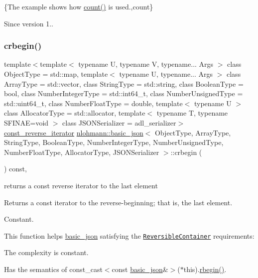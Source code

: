 \{The example shows how {\ttfamily \mbox{\hyperlink{classnlohmann_1_1basic__json_a0d74bfcf65662f1d66d14c34b0027098}{count()}}} is used.,count\}

\begin{DoxySince}{Since}
version 1.. 
\end{DoxySince}
\mbox{\label{classnlohmann_1_1basic__json_a1e0769d22d54573f294da0e5c6abc9de}} 
\subsubsection{\texorpdfstring{crbegin()}{crbegin()}}
{\footnotesize\ttfamily template$<$template$<$ typename U, typename V, typename... Args $>$ class Object\+Type = std\+::map, template$<$ typename U, typename... Args $>$ class Array\+Type = std\+::vector, class String\+Type  = std\+::string, class Boolean\+Type  = bool, class Number\+Integer\+Type  = std\+::int64\+\_\+t, class Number\+Unsigned\+Type  = std\+::uint64\+\_\+t, class Number\+Float\+Type  = double, template$<$ typename U $>$ class Allocator\+Type = std\+::allocator, template$<$ typename T, typename S\+F\+I\+N\+A\+E=void $>$ class J\+S\+O\+N\+Serializer = adl\+\_\+serializer$>$ \\
\mbox{\hyperlink{classnlohmann_1_1basic__json_a72be3c24bfa24f0993d6c11af03e7404}{const\+\_\+reverse\+\_\+iterator}} \mbox{\hyperlink{classnlohmann_1_1basic__json}{nlohmann\+::basic\+\_\+json}}$<$ Object\+Type, Array\+Type, String\+Type, Boolean\+Type, Number\+Integer\+Type, Number\+Unsigned\+Type, Number\+Float\+Type, Allocator\+Type, J\+S\+O\+N\+Serializer $>$\+::crbegin (\begin{DoxyParamCaption}{ }\end{DoxyParamCaption}) const\hspace{0.3cm}{\ttfamily [inline]}, {\ttfamily [noexcept]}}



returns a const reverse iterator to the last element 

Returns a const iterator to the reverse-\/beginning; that is, the last element.

  Constant.

This function helps {\ttfamily \mbox{\hyperlink{classnlohmann_1_1basic__json}{basic\+\_\+json}}} satisfying the \href{https://en.cppreference.com/w/cpp/named_req/ReversibleContainer}{\tt Reversible\+Container} requirements\+:
\begin{DoxyItemize}
\item The complexity is constant.
\item Has the semantics of {\ttfamily const\+\_\+cast$<$const \mbox{\hyperlink{classnlohmann_1_1basic__json}{basic\+\_\+json}}\&$>$($\ast$this).\mbox{\hyperlink{classnlohmann_1_1basic__json_a1ef93e2006dbe52667294f5ef38b0b10}{rbegin()}}}.
\end{DoxyItemize}


